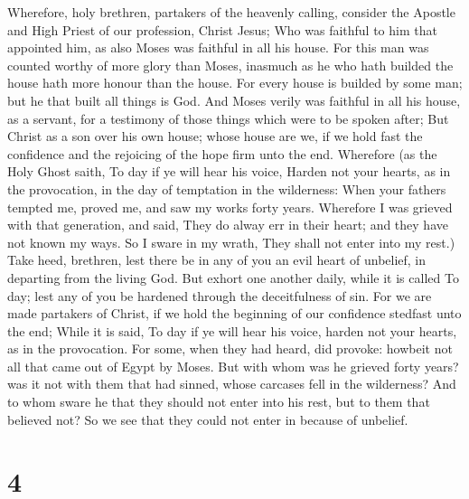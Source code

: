  Wherefore, holy brethren, partakers of the heavenly
calling, consider the Apostle and High Priest of our profession, Christ
Jesus;  Who was faithful to him that appointed him, as also
Moses was faithful in all his house.  For this man was
counted worthy of more glory than Moses, inasmuch as he who hath builded
the house hath more honour than the house.  For every house
is builded by some man; but he that built all things is God.
 And Moses verily was faithful in all his house, as a
servant, for a testimony of those things which were to be spoken after;
 But Christ as a son over his own house; whose house are we,
if we hold fast the confidence and the rejoicing of the hope firm unto
the end.  Wherefore (as the Holy Ghost saith, To day if ye
will hear his voice,  Harden not your hearts, as in the
provocation, in the day of temptation in the wilderness: 
When your fathers tempted me, proved me, and saw my works forty years.
 Wherefore I was grieved with that generation, and said,
They do alway err in their heart; and they have not known my ways.
 So I sware in my wrath, They shall not enter into my
rest.)  Take heed, brethren, lest there be in any of you an
evil heart of unbelief, in departing from the living God. 
But exhort one another daily, while it is called To day; lest any of you
be hardened through the deceitfulness of sin.  For we are
made partakers of Christ, if we hold the beginning of our confidence
stedfast unto the end;  While it is said, To day if ye will
hear his voice, harden not your hearts, as in the provocation.
 For some, when they had heard, did provoke: howbeit not
all that came out of Egypt by Moses.  But with whom was he
grieved forty years? was it not with them that had sinned, whose
carcases fell in the wilderness?  And to whom sware he that
they should not enter into his rest, but to them that believed not?
 So we see that they could not enter in because of
unbelief.

\hypertarget{section-3}{%
\section{4}\label{section-3}}


